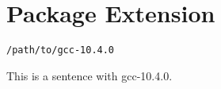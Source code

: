 
\chapter{\label{package-extension}Package Extension}
\begin{verbatim}
/path/to/gcc-10.4.0
\end{verbatim}

\par This is a sentence with gcc-10.4.0.
